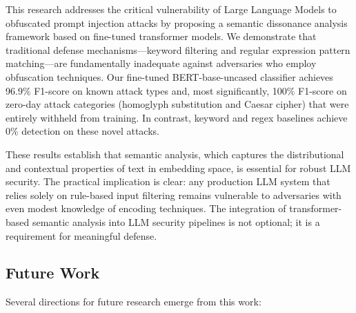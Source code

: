 \documentclass[11pt]{article}
\begin{document}
This research addresses the critical vulnerability of Large Language Models to obfuscated prompt injection attacks by proposing a semantic dissonance analysis framework based on fine-tuned transformer models. We demonstrate that traditional defense mechanisms---keyword filtering and regular expression pattern matching---are fundamentally inadequate against adversaries who employ obfuscation techniques. Our fine-tuned BERT-base-uncased classifier achieves 96.9\% F1-score on known attack types and, most significantly, 100\% F1-score on zero-day attack categories (homoglyph substitution and Caesar cipher) that were entirely withheld from training. In contrast, keyword and regex baselines achieve 0\% detection on these novel attacks.

These results establish that semantic analysis, which captures the distributional and contextual properties of text in embedding space, is essential for robust LLM security. The practical implication is clear: any production LLM system that relies solely on rule-based input filtering remains vulnerable to adversaries with even modest knowledge of encoding techniques. The integration of transformer-based semantic analysis into LLM security pipelines is not optional; it is a requirement for meaningful defense.

\subsection{Future Work}

Several directions for future research emerge from this work:
\end{document}
